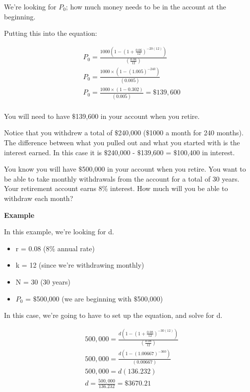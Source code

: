 We're looking for $P _0$; how much money needs to be in the account at the beginning.



Putting this into the equation:

\begin{align} & {{P} _{0}}=\frac{1000\left(1-{{\left(1+\frac{0.06}{12}\right)}^{-20(12)}}\right)}{\left(\frac{0.06}{12}\right)} \\ & {{P} _{0}}=\frac{1000\times\left(1-{{\left(1.005\right)}^{-240}}\right)}{\left(0.005\right)} \\ & {{P} _{0}}=\frac{1000\times\left(1-0.302\right)}{\left(0.005\right)}=\text{\$}139,600 \\    \end{align}



You will need to have $\text{\$}$139,600 in your account when you retire.



Notice that you withdrew a total of $\text{\$}$240,000 ($\text{\$}$1000 a month for 240
months). The difference between what you pulled out and what you started with is the
interest earned. In this case it is $\text{\$}$240,000 - $\text{\$}$139,600 =
$\text{\$}$100,400 in interest.



You know you will have $\text{\$}$500,000 in your account when you retire. You want to be
able to take monthly withdrawals from the account for a total of 30 years. Your retirement
account earns 8\% interest. How much will you be able to withdraw each month?



\textbf{Example}



In this example, we're looking for d.

\begin{itemize}
    \item r = 0.08 (8\% annual rate)
    \item k = 12 (since we're withdrawing monthly)
    \item N = 30 (30 years)
    \item $P _0$ = $\text{\$}$500,000 (we are beginning with $\text{\$}$500,000)
\end{itemize}

In this case, we're going to have to set up the equation, and solve for d.

\begin{align} & 500,000=\frac{d\left(1-{{\left(1+\frac{0.08}{12}\right)}^{-30(12)}}\right)}{\left(\frac{0.08}{12}\right)} \\ & 500,000=\frac{d\left(1-{{\left(1.00667\right)}^{-360}}\right)}{\left(0.00667\right)} \\ & 500,000=d(136.232) \\  &d=\frac{500,000}{136.232}=\$3670.21  \\    \end{align}


